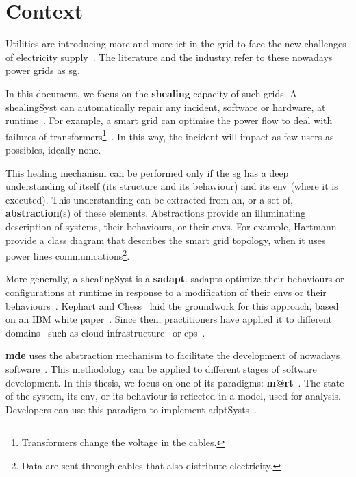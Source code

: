 \section{Context}
Utilities are introducing more and more \gls{ict} in the grid to face the new challenges of electricity supply~\cite{farhangi2010path, ipakchi2009grid, DBLP:journals/comsur/FangMXY12}.
The literature and the industry refer to these nowadays power grids as \gls{sg}.

In this document, we focus on the \textbf{\gls{shealing}} capacity of such grids.
A \gls{shealingSyst} can automatically repair any incident, software or hardware, at runtime~\cite{DBLP:journals/computer/KephartC03}.
For example, a smart grid can optimise the power flow to deal with failures of transformers\footnote{Transformers change the voltage in the cables.}~\cite{DBLP:journals/comsur/FangMXY12}.
In this way, the incident will impact as few users as possibles, ideally none. 

This healing mechanism can be performed only if the \gls{sg} has a deep understanding of itself (its \gls{structure} and its \gls{behaviour}) and its \gls{env} (where it is executed).
This understanding can be extracted from an, or a set of, \textbf{abstraction}(s) of these elements.
Abstractions provide an illuminating description of systems, their \glspl{behaviour}, or their \glspl{env}.
For example, Hartmann~\etal \cite{DBLP:conf/smartgridcomm/0001FKTPTR14} provide a class diagram that describes the smart grid topology, when it uses power lines communications\footnote{Data are sent through cables that also distribute electricity.}.

\bigskip

More generally, a \gls{shealingSyst} is a \textbf{\gls{sadapt}}. 
\Glspl{sadapt} optimize their \glspl{behaviour} or configurations at runtime in response to a modification of their \glspl{env} or their \glspl{behaviour}~\cite{DBLP:conf/dagstuhl/ChengLGIMABBBCSDFGGGKKKLMMMPSTTWW09}.
Kephart and Chess~\cite{DBLP:journals/computer/KephartC03} laid the groundwork for this approach, based on an IBM white paper~\cite{computing2006architectural}.
Since then, practitioners have applied it to different domains~\cite{DBLP:journals/corr/abs-1904-01518} such as cloud infrastructure~\cite{DBLP:conf/icac/JavadiG17, OpenStack:Watcher:Wiki, DBLP:conf/icse/BarnaKFL17} or \gls{cps}~\cite{DBLP:conf/icac/LalandaGC17, DBLP:conf/cbse/FouquetMFBPJ12, DBLP:conf/smartgridsec/0001FKNT14}.

\textbf{\Gls{mde}} uses the abstraction mechanism to facilitate the development of nowadays software~\cite{DBLP:journals/computer/Schmidt06, DBLP:conf/ifm/Kent02, DBLP:series/synthesis/2017Brambilla}.
This methodology can be applied to different stages of software development.
In this thesis, we focus on one of its paradigms: \textbf{\gls{m@rt}}~\cite{DBLP:journals/computer/BlairBF09, DBLP:journals/computer/MorinBJFS09}.
The state of the system, its \gls{env}, or its \gls{behaviour} is reflected in a \gls{model}, used for analysis.
Developers can use this paradigm to implement \glspl{adptSyst}~\cite{DBLP:journals/computer/MorinBJFS09, DBLP:conf/smartgridsec/0001FKNT14}.

